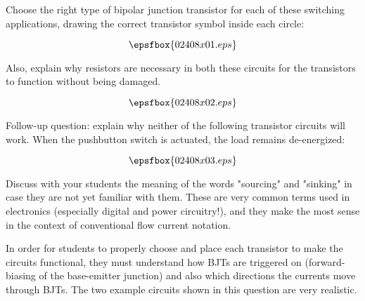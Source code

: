 

Choose the right type of bipolar junction transistor for each of these switching applications, drawing the correct transistor symbol inside each circle:

$$\epsfbox{02408x01.eps}$$

Also, explain why resistors are necessary in both these circuits for the transistors to function without being damaged.







$$\epsfbox{02408x02.eps}$$

\vskip 10pt

Follow-up question: explain why neither of the following transistor circuits will work.  When the pushbutton switch is actuated, the load remains de-energized:

$$\epsfbox{02408x03.eps}$$







Discuss with your students the meaning of the words "sourcing" and "sinking" in case they are not yet familiar with them.  These are very common terms used in electronics (especially digital and power circuitry!), and they make the most sense in the context of conventional flow current notation.

In order for students to properly choose and place each transistor to make the circuits functional, they must understand how BJTs are triggered on (forward-biasing of the base-emitter junction) and also which directions the currents move through BJTs.  The two example circuits shown in this question are very realistic.




